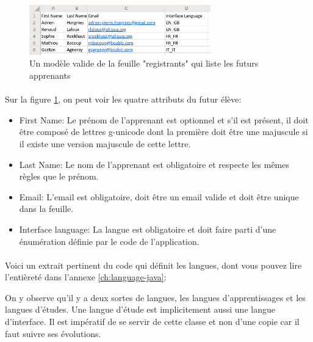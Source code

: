 \begin{figure}[ht]
    \centering
    \includegraphics[width=0.7\textwidth]{images/screenshot/sheet-users.png}
    \caption{Un modèle valide de la feuille "registrants" qui liste les futurs apprenants}
    \label{fig:sheet-learners}
\end{figure}

\paragraph{}
Sur la figure \ref{fig:sheet-learners}, on peut voir les quatre attributs du futur élève:
\begin{itemize}
    \item First Name: Le prénom de l'apprenant est optionnel et s'il est présent, il doit être composé de lettres \gls{g-unicode} dont la première doit être une majuscule si il existe une version majuscule de cette lettre\fnmark{}.
    \item Last Name: Le nom de l'apprenant est obligatoire et respecte les mêmes règles que le prénom.
    \item Email: L'email est obligatoire, doit être un email valide et doit être unique dans la feuille.
    \item Interface language: La langue est obligatoire et doit faire parti d'une énumération définie par le code de l'application.
\end{itemize}

\paragraph{}
Voici un extrait pertinent du code qui définit les langues, dont vous pouvez lire l'entièreté dans l'annexe \ref{ch:language-java}:



On y observe qu'il y a deux sortes de langues, les langues d'apprentissages et les langues d'études.
Une langue d'étude est implicitement aussi une langue d'interface.
Il est impératif de se servir de cette classe et non d'une copie car il faut suivre ses évolutions.

